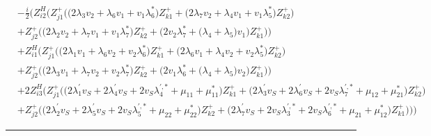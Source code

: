 \begin{align} 
 &-\frac{i}{2} \Big(Z_{{i 2}}^{H} \Big(Z_{{j 1}}^{+} \Big(\Big(2 \lambda_3 v_2  + \lambda_6 v_1  + v_1 \lambda_6^* \Big)Z_{{k 1}}^{+}  + \Big(2 \lambda_7 v_2  + \lambda_4 v_1  + v_1 \lambda_5^* \Big)Z_{{k 2}}^{+} \Big)\nonumber \\ 
 &+Z_{{j 2}}^{+} \Big(\Big(2 \lambda_2 v_2  + \lambda_7 v_1  + v_1 \lambda_7^* \Big)Z_{{k 2}}^{+}  + \Big(2 v_2 \lambda_7^*  + \Big(\lambda_4 + \lambda_5\Big)v_1 \Big)Z_{{k 1}}^{+} \Big)\Big)\nonumber \\ 
 &+Z_{{i 1}}^{H} \Big(Z_{{j 1}}^{+} \Big(\Big(2 \lambda_1 v_1  + \lambda_6 v_2  + v_2 \lambda_6^* \Big)Z_{{k 1}}^{+}  + \Big(2 \lambda_6 v_1  + \lambda_4 v_2  + v_2 \lambda_5^* \Big)Z_{{k 2}}^{+} \Big)\nonumber \\ 
 &+Z_{{j 2}}^{+} \Big(\Big(2 \lambda_3 v_1  + \lambda_7 v_2  + v_2 \lambda_7^* \Big)Z_{{k 2}}^{+}  + \Big(2 v_1 \lambda_6^*  + \Big(\lambda_4 + \lambda_5\Big)v_2 \Big)Z_{{k 1}}^{+} \Big)\Big)\nonumber \\ 
 &+2 Z_{{i 3}}^{H} \Big(Z_{{j 1}}^{+} \Big(\Big(2 \lambda^{\prime}_1 v_S  + 2 \lambda^{\prime}_4 v_S  + 2 v_S \lambda^{{\prime},*}_4  + \mu_{11} + \mu_{11}^*\Big)Z_{{k 1}}^{+}  + \Big(2 \lambda^{\prime}_3 v_S  + 2 \lambda^{\prime}_6 v_S  + 2 v_S \lambda^{{\prime},*}_7  + \mu_{12} + \mu_{21}^*\Big)Z_{{k 2}}^{+} \Big)\nonumber \\ 
 &+Z_{{j 2}}^{+} \Big(\Big(2 \lambda^{\prime}_2 v_S  + 2 \lambda^{\prime}_5 v_S  + 2 v_S \lambda^{{\prime},*}_5  + \mu_{22} + \mu_{22}^*\Big)Z_{{k 2}}^{+}  + \Big(2 \lambda^{\prime}_7 v_S  + 2 v_S \lambda^{{\prime},*}_3  + 2 v_S \lambda^{{\prime},*}_6  + \mu_{21} + \mu_{12}^*\Big)Z_{{k 1}}^{+} \Big)\Big)\Big)\end{align} 
\hrule 
